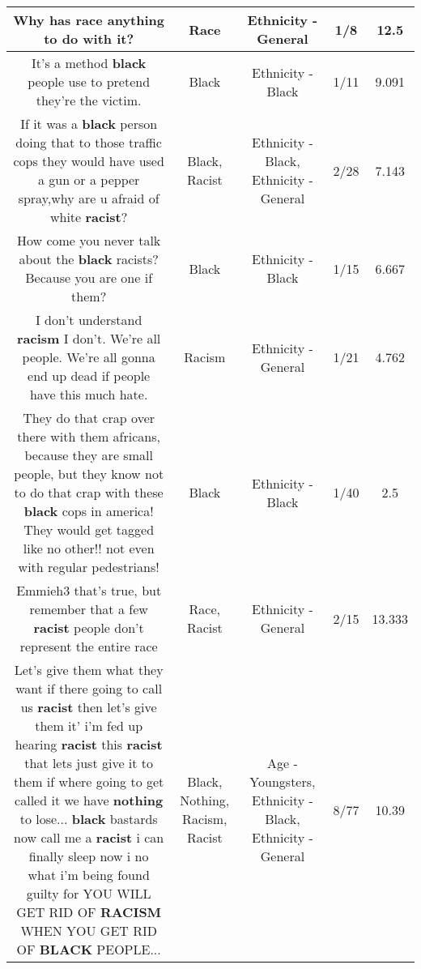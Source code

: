 \documentclass[11pt]{article}
\newlength\mylength
\begin{document}
\begin{center}
\begin{longtable}{|C{.65\mylength}|C{.30\mylength}|C{.12\mylength}|C{.12\mylength}|C{.12\mylength}|}
  \small Why has \textbf{race} anything to do with it?\normalsize   & Race & Ethnicity - General & 1/8 & 12.5 \\  \hline
  \small It's a method \textbf{black} people use to pretend they're the victim.\normalsize   & Black & Ethnicity - Black & 1/11 & 9.091 \\  \hline
  \small If it was a \textbf{black} person doing that to those traffic cops they would have used a gun or a pepper spray,why are u afraid of white \textbf{racist}?\normalsize   & Black, Racist & Ethnicity - Black, Ethnicity - General & 2/28 & 7.143 \\  \hline
  \small How come you never talk about the \textbf{black} racists?  Because you are one if them?\normalsize   & Black & Ethnicity - Black & 1/15 & 6.667 \\  \hline
  \small I don't understand \textbf{racism} I don't. We're all people. We're all gonna end up dead if people have this much hate.\normalsize   & Racism & Ethnicity - General & 1/21 & 4.762 \\  \hline
  \small They do that crap over there with them africans, because they are small people, but they know not to do that crap with these \textbf{black} cops in america! They would get tagged like no other!! not even with regular pedestrians!\normalsize   & Black & Ethnicity - Black & 1/40 & 2.5 \\  \hline
  \small Emmieh3 that's true, but remember that a few \textbf{racist} people don't represent the entire race\normalsize   & Race, Racist & Ethnicity - General & 2/15 & 13.333 \\  \hline
  \small Let's give them what they want if there going to call us \textbf{racist} then let's give them it' i'm fed up hearing \textbf{racist} this \textbf{racist} that lets just give it to them if where going to get called it we have \textbf{nothing} to lose... \textbf{black} bastards now call me a \textbf{racist} i can finally sleep now i no what i'm being found guilty for YOU WILL GET RID OF \textbf{RACISM} WHEN YOU GET RID OF \textbf{BLACK} PEOPLE...\normalsize   & Black, Nothing, Racism, Racist & Age - Youngsters, Ethnicity - Black, Ethnicity - General & 8/77 & 10.39 \\  \hline

\end{longtable}
\end{center}
\end{document}
